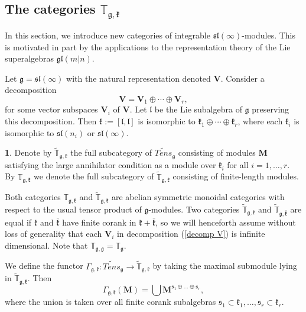 \documentclass[12pt,oneside,english]{amsart}
\numberwithin{equation}{section}
\numberwithin{figure}{section}
\theoremstyle{plain}
\theoremstyle{plain}
\theoremstyle{remark}
\theoremstyle{definition}
\newtheorem{defn}[thm]{\protect\definitionname}
\theoremstyle{plain}
\theoremstyle{remark}
\theoremstyle{definition}
\theoremstyle{plain}
\theoremstyle{plain}
\theoremstyle{definition}
\providecommand{\definitionname}{Definition}
\newcommand{\bV}{\mathbf{V}}
\newcommand{\bM}{\mathbf{M}}
\newcommand{\fg}{\mathfrak{g}}
\newcommand{\fl}{\mathfrak{l}}
\newcommand{\fk}{\mathfrak{k}}
\newcommand{\fs}{\mathfrak{s}}
\begin{document}



\subsection{The categories $\mathbb{T}_{\fg,\fk}$}

In this section, we introduce new categories of integrable $\mathfrak{sl}(\infty)$-modules. This is motivated in part by the applications to the representation theory of the Lie superalgebras $\mathfrak{gl}(m|n)$.


Let $\fg=\mathfrak{sl}(\infty)$ with the natural representation denoted $\bV$. Consider a decomposition
\begin{equation}\label{decomp V} \bV=\bV_1\oplus\cdots\oplus\bV_r,\end{equation}
for some vector subspaces $\bV_i$ of $\bV$.
Let $\fl$  be the Lie subalgebra of $\fg$ preserving this decomposition. Then $\fk:=[\fl,\fl]$ is isomorphic to
$\fk_1\oplus\cdots\oplus\fk_r$, where each $\fk_i$ is isomorphic to  $\mathfrak{sl}(n_i)$ or $\mathfrak{sl}(\infty)$.



\begin{defn}\label{def: cat T}
Denote by $\widetilde{\mathbb{T}}_{\fg,\fk}$ the full subcategory of $\widetilde{Tens}_{\mathfrak{g}}$ consisting of modules $\bM$ satisfying the large annihilator condition as a module over $\fk_i$ for all $i=1,\dots,r$. By $\mathbb{T}_{\fg,\fk}$ we denote the full subcategory of $\widetilde{\mathbb{T}}_{\fg,\fk}$ consisting of finite-length modules.
\end{defn}

Both categories $\mathbb{T}_{\fg,\fk}$ and  $\widetilde{\mathbb{T}}_{\fg,\fk}$ are abelian symmetric monoidal categories with respect to the usual tensor product of $\fg$-modules. Two categories  $\widetilde{\mathbb{T}}_{\fg,\fk}$ and  $\widetilde{\mathbb{T}}_{\fg,\bar{\fk}}$ are equal if  $\fk$ and $\bar{\fk}$ have finite corank in $\fk+\bar{\fk}$, so we will henceforth assume without loss of generality that each $\bV_i$ in decomposition (\ref{decomp V}) is infinite dimensional. Note that $\mathbb{T}_{\fg,\fg}=\mathbb{T}_{\fg}$.



We define the functor $\Gamma_{\fg,\fk}:\widetilde{Tens}_{\mathfrak{g}}\to \widetilde{\mathbb{T}}_{\fg,\fk}$ by taking the maximal submodule lying in
$\widetilde{\mathbb{T}}_{\fg,\fk}$. Then
\begin{equation}\label{Gamma functor}
\Gamma_{\fg,\fk}(\bM)=\bigcup \bM^{\fs_1\oplus\dots\oplus\fs_r},
\end{equation}
where the union is taken over all finite corank subalgebras $\fs_1\subset\fk_1,\dots,\fs_r\subset\fk_r$.
\end{document}
